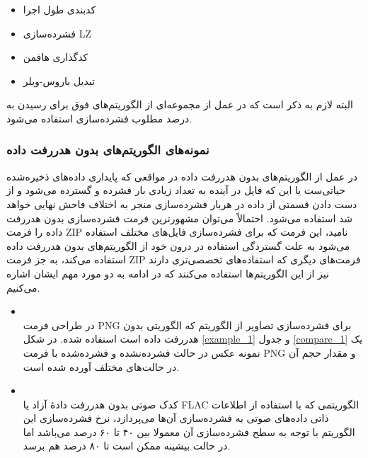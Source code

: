 \begin{itemize}
	\item کدبندی طول اجرا
	\item فشرده‌سازی LZ
	\item کدگذاری هافمن
	\item تبدیل باروس-ویلر
\end{itemize}

البته لازم به ذکر است که در عمل از مجموعه‌ای از الگوریتم‌های فوق برای رسیدن به درصد مطلوب فشرده‌سازی استفاده می‌شود.

\subsubsection{نمونه‌های الگوریتم‌های بدون هدررفت داده}
در عمل از الگوریتم‌های بدون هدررفت داده در مواقعی که 
پایداری داده‌های ذخیره‌شده حیاتی‌ست یا این که فایل در آینده به تعداد زیادی بار فشرده و گسترده می‌شود و از دست دادن قسمتی از داده در
هربار فشرده‌سازی منجر به اختلاف فاحش نهایی خواهد شد استفاده می‌شود. احتمالاً می‌توان مشهورترین فرمت فشرده‌سازی بدون هدررفت داده را
فرمت 
ZIP
نامید، این فرمت که برای فشرده‌سازی فایل‌های مختلف استفاده می‌شود به علت گستردگی استفاده در درون خود از 
الگوریتم‌های بدون هدررفت داده استفاده می‌کند، به جز فرمت ZIP 
فرمت‌های دیگری که استفاده‌های تخصصی‌تری دارند نیز از این الگوریتم‌ها استفاده می‌کنند که در ادامه به دو مورد مهم ایشان اشاره می‌کنیم.

\begin{itemize}
	\item {}\\
	در طراحی فرمت PNG برای فشرده‌سازی تصاویر از الگوریتم
	که الگوریتی بدون هدررفت داده است استفاده شده. 
	در 
	شکل 	\ref{example_1} و 
	جدول 	\ref{compare_1} 
	یک نمونه عکس در حالت فشرده‌نشده و فشرده‌شده با فرمت PNG
	و مقدار حجم آن در حالت‌های مختلف آورده شده است.

	\item {}\\
	کدک صوتی بدون هدررفت دادهٔ آزاد  یا FLAC
	الگوریتمی که با استفاده از اطلاعات ذاتی داده‌های صوتی به فشرده‌سازی آن‌ها می‌پردازد، نرخ فشرده‌سازی این الگوریتم با توجه به 
	سطح فشرده‌سازی آن معمولا بین ۴۰ تا ۶۰ درصد می‌باشد اما در حالت بیشینه ممکن است تا ۸۰ درصد هم برسد.
	
\end{itemize}

